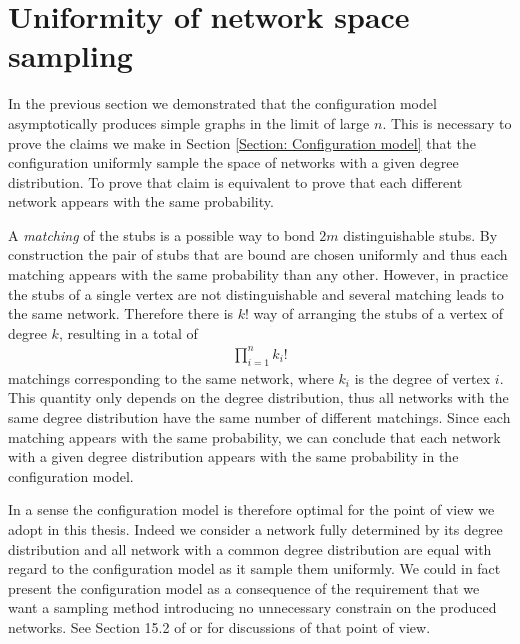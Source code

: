 \documentclass[
11pt, %
english, %
singlespacing, %
nolistspacing, %
liststotoc, %
headsepline, %
]{MastersDoctoralThesis} %
\begin{document}
\section{Uniformity of network space sampling}

In the previous section we demonstrated that the configuration model asymptotically produces simple graphs in the limit of large $n$. This is necessary to prove the claims we make in Section \ref{Section: Configuration model} that the configuration uniformly sample the space of networks with a given degree distribution. To prove that claim is equivalent to prove that each different network appears with the same probability.


A \emph{matching} of the stubs is a possible way to bond $2 m$ distinguishable stubs. By construction the pair of stubs that are bound are chosen uniformly and thus each matching appears with the same probability than any other. However, in practice the stubs of a single vertex are not distinguishable and several matching leads to the same network. Therefore there is $k!$ way of arranging the stubs of a vertex of degree $k$, resulting in a total of
\begin{align}
	\prod_{i = 1}^n k_i!
\end{align}
matchings corresponding to the same network, where $k_i$ is the degree of vertex $i$. This quantity only depends on the degree distribution, thus all networks with the same degree distribution have the same number of different matchings. Since each matching appears with the same probability, we can conclude that each network with a given degree distribution appears with the same probability in the configuration model.

In a sense the configuration model is therefore optimal for the point of view we adopt in this thesis. Indeed we consider a network fully determined by its degree distribution and all network with a common degree distribution are equal with regard to the configuration model as it sample them uniformly. We could in fact present the configuration model as a consequence of the requirement that we want a sampling method introducing no unnecessary constrain on the produced networks. See Section 15.2 of \cite{newman2010networks} or  for discussions of that point of view.
\end{document}
